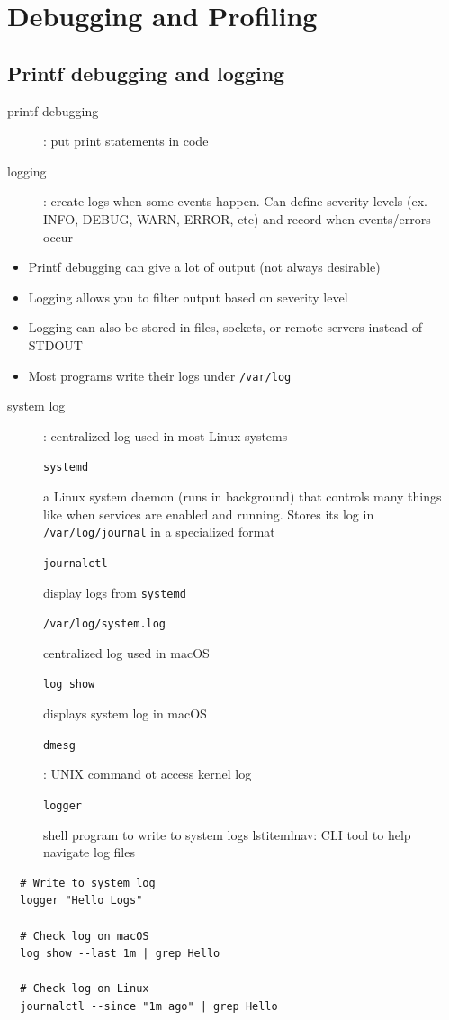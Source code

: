 \documentclass[letterpaper,12pt]{article}
\newcommand*{\lstitem}[1]{
  \setbox0\hbox{\lstinline{#1}}
  \item[\usebox0]
}
\begin{document}
\section{Debugging and Profiling}

\subsection{Printf debugging and logging}
\begin{description}
 \item[printf debugging]: put print statements in code
 \item[logging]: create logs when some events happen. Can define severity levels (ex. INFO, DEBUG, WARN, ERROR, etc) and record when events/errors occur
\end{description}
\begin{itemize}
 \item Printf debugging can give a lot of output (not always desirable)
 \item Logging allows you to filter output based on severity level
 \item Logging can also be stored in files, sockets, or remote servers instead of STDOUT
 \item Most programs write their logs under \lstinline{/var/log}
\end{itemize}

\begin{description}
 \item[system log]: centralized log used in most Linux systems
       \lstitem{systemd} a Linux system daemon (runs in background) that controls many things like when services are enabled and running. Stores its log in \lstinline{/var/log/journal} in a specialized format
       \lstitem{journalctl} display logs from \lstinline{systemd}
       \lstitem{/var/log/system.log} centralized log used in macOS
       \lstitem{log show} displays system log in macOS
       \lstitem{dmesg}: UNIX command ot access kernel log
       \lstitem{logger} shell program to write to system logs
       lstitem{lnav}: CLI tool to help navigate log files
\end{description}

\begin{lstlisting}
  # Write to system log
  logger "Hello Logs"

  # Check log on macOS
  log show --last 1m | grep Hello

  # Check log on Linux
  journalctl --since "1m ago" | grep Hello
\end{lstlisting}
\end{document}
